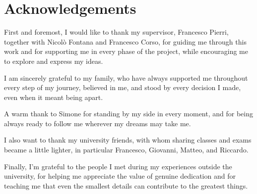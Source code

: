 \section*{Acknowledgements}

First and foremost, I would like to thank my supervisor, Francesco Pierri, together with Nicolò Fontana and Francesco Corso, for guiding me through this work and for supporting me in every phase of the project, while encouraging me to explore and express my ideas.

\smallskip
I am sincerely grateful to my family, who have always supported me throughout every step of my journey, believed in me, and stood by every decision I made, even when it meant being apart.

\smallskip
A warm thank to Simone for standing by my side in every moment, and for being always ready to follow me wherever my dreams may take me.

\smallskip
I also want to thank my university friends, with whom sharing classes and exams became a little lighter, in particular Francesco, Giovanni, Matteo, and Riccardo.

\smallskip
Finally, I'm grateful to the people I met during my experiences outside the university, for helping me appreciate the value of genuine dedication and for teaching me that even the smallest details can contribute to the greatest things.